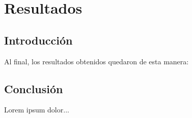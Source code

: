 
\chapter{Resultados} %

\label{Res} %

\section{Introducción}

Al final, los resultados obtenidos quedaron de esta manera: \\

\section{Conclusión}

Lorem ipsum dolor...